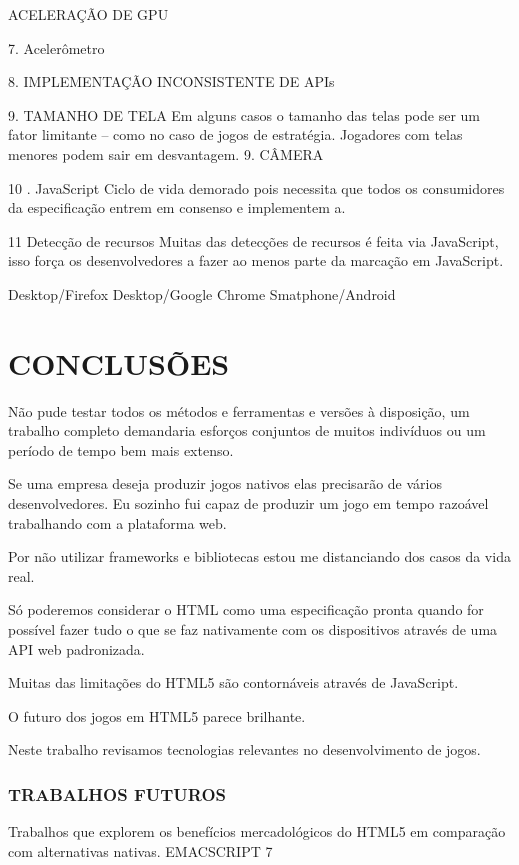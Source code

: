 \documentclass[
12pt,
a4paper,
portuges,
draft
]{report}
\begin{document}
ACELERAÇÃO DE GPU

7. Acelerômetro

8. IMPLEMENTAÇÃO INCONSISTENTE DE APIs

9.  TAMANHO DE TELA
Em alguns casos o tamanho das telas pode ser um fator limitante – como
no caso de jogos de estratégia. Jogadores com telas menores podem sair
em desvantagem. 9. CÂMERA

10 . JavaScript
Ciclo de vida demorado pois necessita que todos os consumidores da
especificação entrem em consenso e implementem a.

11  Detecção de recursos
Muitas das detecções de recursos é feita via JavaScript, isso força os desenvolvedores a fazer ao menos parte da marcação em JavaScript\autocite{diveIntohtml}.

Desktop/Firefox
Desktop/Google Chrome
Smatphone/Android

\chapter{CONCLUSÕES}
\thispagestyle{myheadings}

Não pude testar todos os métodos e ferramentas e versões à
disposição, um trabalho completo demandaria esforços conjuntos de
muitos indivíduos ou um período de tempo bem mais extenso. 

Se uma empresa deseja produzir jogos nativos elas precisarão de vários
desenvolvedores. Eu sozinho fui capaz de produzir um jogo em tempo
razoável trabalhando com a plataforma web.

Por não utilizar frameworks e bibliotecas estou me distanciando
dos casos da vida real.

Só poderemos considerar o HTML como uma especificação pronta quando for possível fazer tudo o que se faz nativamente com os dispositivos através de uma API web padronizada.

Muitas das limitações do HTML5 são contornáveis através de JavaScript.

O futuro dos jogos em HTML5 parece brilhante.


Neste trabalho revisamos tecnologias relevantes no desenvolvimento de jogos.


\subsection{TRABALHOS FUTUROS}

Trabalhos que explorem os benefícios mercadológicos do HTML5 em comparação com alternativas nativas.
EMACSCRIPT 7
\end{document}
